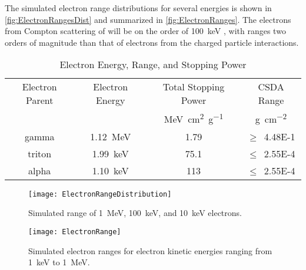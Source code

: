 The simulated electron range distributions for several energies is shown in \autoref{fig:ElectronRangesDist} and summarized in \autoref{fig:ElectronRanges}.
The electrons  from Compton scattering of  will be on the order of \SI{100}{\keV} , with ranges two orders of magnitude than that of electrons from the charged particle interactions.
\begin{table}[ht]
  \caption[Electron Energy, Range, and Stopping Power]{Electron Energy, Range, and Stopping Power \protect\cite{berger_estar_2005,turner_atoms_2008}}
	\centering
	\begin{tabular}{c | c S c}
	\toprule
	{Electron Parent} & {Electron Energy} & {Total Stopping Power} & {CSDA Range} \\
	 &  & \si{\mega\eV \cm\squared \per \gram} & \si{\gram\per\cm\squared} \\
	\midrule
	{gamma}  & \SI{1.12}{\mega\eV} & 1.79 & $\ge$~\num{4.48E-1} \\
	{triton} & \SI{1.99}{\kilo\eV} & 75.1 & $\le$~\num{2.55E-4} \\
	{alpha}  & \SI{1.10}{\kilo\eV} & 113  & $\le$~\num{2.55E-4} \\
	\bottomrule
	\end{tabular}
  \label{tab:BasicEDepOutline}
\end{table}
\begin{figure}
  \centering
      \texttt{[image: ElectronRangeDistribution]}
      \caption[Simulated Electron Ranges Distributions in Polystyrene]{Simulated range of \SI{1}{\MeV}, \SI{100}{\keV}, and \SI{10}{\keV} electrons.\rangeSimGeo}
      \label{fig:ElectronRangesDist}
\end{figure}
\begin{figure}
	\centering
      \texttt{[image: ElectronRange]}
  \caption[Simulated Electron Ranges in Polystyrene]{Simulated electron ranges for electron kinetic energies ranging from \SI{1}{\keV} to \SI{1}{\MeV}.\rangeSimGeo} 
  \label{fig:ElectronRanges}
\end{figure}


